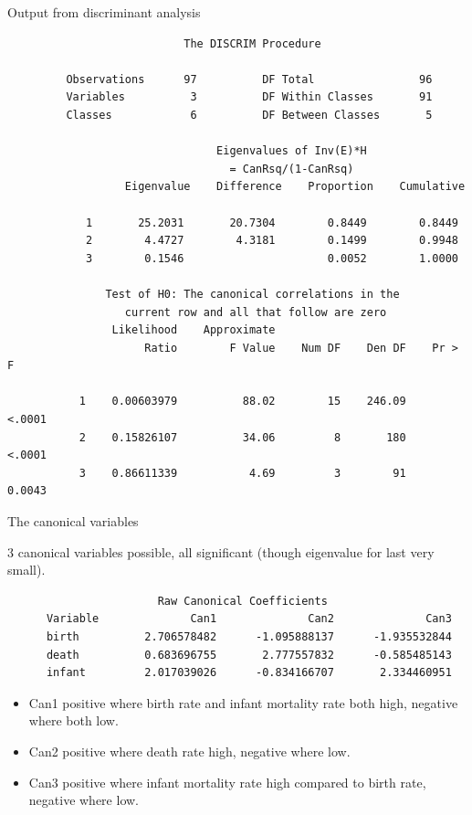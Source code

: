 \documentclass[pdf]{prosper}
\begin{document}
\begin{slide}{Output from discriminant analysis}

{\scriptsize
\begin{verbatim}
                           The DISCRIM Procedure

         Observations      97          DF Total                96
         Variables          3          DF Within Classes       91
         Classes            6          DF Between Classes       5

                                Eigenvalues of Inv(E)*H
                                  = CanRsq/(1-CanRsq)
                  Eigenvalue    Difference    Proportion    Cumulative

            1       25.2031       20.7304        0.8449        0.8449
            2        4.4727        4.3181        0.1499        0.9948
            3        0.1546                      0.0052        1.0000

               Test of H0: The canonical correlations in the
                  current row and all that follow are zero
                Likelihood    Approximate
                     Ratio        F Value    Num DF    Den DF    Pr > F

           1    0.00603979          88.02        15    246.09    <.0001
           2    0.15826107          34.06         8       180    <.0001
           3    0.86611339           4.69         3        91    0.0043

\end{verbatim}
}


\end{slide}

\begin{slide}{The canonical variables}

3 canonical variables possible, all significant (though eigenvalue for last very small).
  
{\scriptsize
\begin{verbatim}
                       Raw Canonical Coefficients
      Variable              Can1              Can2              Can3
      birth          2.706578482      -1.095888137      -1.935532844
      death          0.683696755       2.777557832      -0.585485143
      infant         2.017039026      -0.834166707       2.334460951
\end{verbatim}
}

\begin{itemize}
\item Can1 positive where birth rate and infant mortality rate both high, negative where both low.
\item Can2 positive where death rate high, negative where low.
\item Can3 positive where infant mortality rate high compared to birth rate, negative where low.
\end{itemize}
  
\end{slide}
\end{document}
